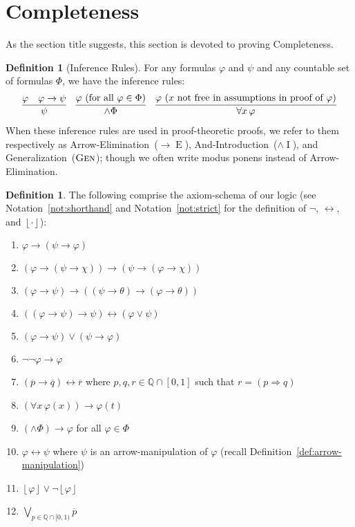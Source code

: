 \documentclass{amsart}
\theoremstyle{definition}
\newtheorem{definition}[theorem]{Definition}
\numberwithin{equation}{theorem}
\renewcommand{\phi}{\varphi}
\newcommand{\Q}{\mathbb{Q}}
\newcommand{\unwedge}{{\wedge}}
\newcommand{\strict}[1]{{\left\lfloor#1\right\rfloor}}
\newcommand{\rat}[1]{{\overline{#1}}}
\newcommand{\narrow}[1]{\xrightarrow{#1}}
\renewcommand{\to}{\narrow{}}
\newcommand{\arr}{{\to}}
\newcommand{\intro}{\!\operatorname{I}}
\newcommand{\elim}{\!\operatorname{E}}
\newcommand{\generalization}{\text{\sc{Gen}}}
\begin{document}
\section{Completeness}
As the section title suggests, this section is devoted to proving Completeness.
\begin{definition}[Inference Rules]
  For any formulas $\phi$ and $\psi$ and any countable set of formulas $\Phi$, we have the inference rules:
  \begin{align*}
    \infer{\psi}{\phi & \phi\to\psi} &&
    \infer{\unwedge\Phi}{\phi\text{ (for all $\phi\in\Phi$)}} &&
    \infer{\forall x\,\phi}{\phi\text{ ($x$ not free in assumptions in proof of $\phi$)}}
  \end{align*}
  When these inference rules are used in proof-theoretic proofs, we refer to them respectively as Arrow-Elimination~($\arr\elim$), And-Introduction~($\unwedge\intro$), and Generalization~($\generalization$); though we often write modus ponens instead of Arrow-Elimination.
\end{definition}
\begin{definition}
  The following comprise the axiom-schema of our logic (see Notation~\ref{not:shorthand} and Notation~\ref{not:strict} for the definition of $\neg$, $\leftrightarrow$, and $\strict{\cdot}$):
	\begin{enumerate}[label=(A\arabic*)]
		\item\label{itm:axiom-weakening}
			$\phi\to(\psi\to\phi)$
	  \item\label{itm:axiom-swap}
	    $(\phi\to(\psi\to\chi))\to(\psi\to(\phi\to\chi))$
		\item\label{itm:axiom-trans}
			$(\phi\to\psi)\to((\psi\to\theta)\to(\phi\to\theta))$
		\item\label{itm:axiom-vee}
			$((\phi\to\psi)\to\psi)\leftrightarrow(\phi\vee\psi)$
    \item\label{itm:axiom-order}
      $(\phi\to\psi)\vee(\psi\to\phi)$
		\item\label{itm:axiom-classic}
			$\neg\neg\phi\to\phi$
		\item\label{itm:axiom-rationals}
			$(\rat p\rightarrow\rat q)\leftrightarrow \rat r$ where $p,q,r\in\Q\cap[0,1]$ such that $r=(p\Rightarrow q)$
		\item\label{itm:axiom-forall-arrow}
			$(\forall x\,\phi(x))\rightarrow\phi(t)$
		\item\label{itm:axiom-and}
			$(\unwedge\Phi)\rightarrow\phi$ for all $\phi\in\Phi$
		\item\label{itm:axiom-pushdown}
			$\phi\leftrightarrow\psi$ where $\psi$ is an arrow-manipulation of $\phi$ (recall Definition~\ref{def:arrow-manipulation})
	  \item\label{itm:axiom-loe}
      $\strict\phi\vee\neg\strict\phi$
	  \item\label{itm:axiom-approach}
      $\bigvee_{p\in\Q\cap[0,1)}\rat p$	  
		\end{enumerate}
\end{definition}
\end{document}

